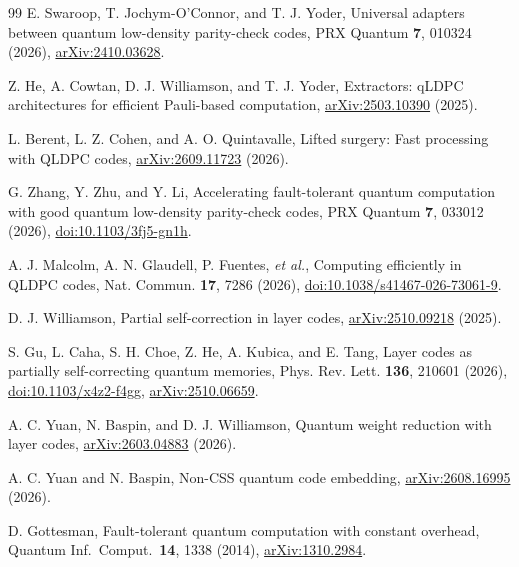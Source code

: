 \begin{thebibliography}{99}
E. Swaroop, T. Jochym-O'Connor, and T. J. Yoder, Universal adapters between quantum low-density parity-check codes, PRX Quantum \textbf{7}, 010324 (2026), \href{https://arxiv.org/abs/2410.03628}{arXiv:2410.03628}.

Z. He, A. Cowtan, D. J. Williamson, and T. J. Yoder, Extractors: qLDPC architectures for efficient Pauli-based computation, \href{https://arxiv.org/abs/2503.10390}{arXiv:2503.10390} (2025).

L. Berent, L. Z. Cohen, and A. O. Quintavalle, Lifted surgery: Fast processing with QLDPC codes, \href{https://arxiv.org/abs/2609.11723}{arXiv:2609.11723} (2026).

G. Zhang, Y. Zhu, and Y. Li, Accelerating fault-tolerant quantum computation with good quantum low-density parity-check codes, PRX Quantum \textbf{7}, 033012 (2026), \href{https://doi.org/10.1103/3fj5-gn1h}{doi:10.1103/3fj5-gn1h}.

A. J. Malcolm, A. N. Glaudell, P. Fuentes, \emph{et al.}, Computing efficiently in QLDPC codes, Nat. Commun. \textbf{17}, 7286 (2026), \href{https://doi.org/10.1038/s41467-026-73061-9}{doi:10.1038/s41467-026-73061-9}.

D. J. Williamson, Partial self-correction in layer codes, \href{https://arxiv.org/abs/2510.09218}{arXiv:2510.09218} (2025).

S. Gu, L. Caha, S. H. Choe, Z. He, A. Kubica, and E. Tang, Layer codes as partially self-correcting quantum memories, Phys. Rev. Lett. \textbf{136}, 210601 (2026), \href{https://doi.org/10.1103/x4z2-f4gg}{doi:10.1103/x4z2-f4gg}, \href{https://arxiv.org/abs/2510.06659}{arXiv:2510.06659}.

A. C. Yuan, N. Baspin, and D. J. Williamson, Quantum weight reduction with layer codes, \href{https://arxiv.org/abs/2603.04883}{arXiv:2603.04883} (2026).

A. C. Yuan and N. Baspin, Non-CSS quantum code embedding, \href{https://arxiv.org/abs/2608.16995}{arXiv:2608.16995} (2026).

D. Gottesman, Fault-tolerant quantum computation with constant overhead, Quantum Inf.\ Comput.\ \textbf{14}, 1338 (2014), \href{https://arxiv.org/abs/1310.2984}{arXiv:1310.2984}.


\end{thebibliography}
